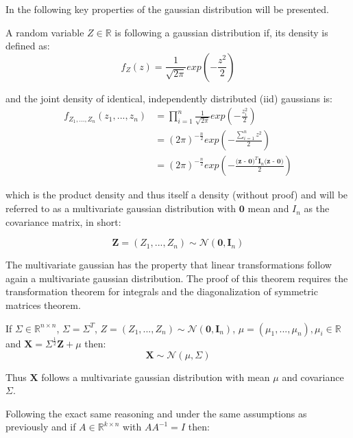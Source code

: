 \documentclass[
]{article}
\begin{document}
In the following key properties of the gaussian distribution will be
presented.

A random variable \(Z \in \mathbb{R}\) is following a gaussian
distribution if, its density is defined as: \[
\begin{equation*}
    f_Z(z) = \frac{1}{\sqrt{2\pi}} exp(-\frac{z^2}{2})
\end{equation*}
\]

and the joint density of identical, independently distributed (iid)
gaussians is: \[
\begin{equation*} 
    \begin{aligned}
        f_{Z_1,...,Z_n}(z_1,...,z_n) &= \prod_{i=1}^n \frac{1}{\sqrt{2\pi}} exp(-\frac{z_i^2}{2}) \\
                      &= (2\pi)^{-\frac{n}{2}}exp(-\frac{\sum_{i=1}^nz^2}{2}) \\
                      &= (2\pi)^{-\frac{n}{2}}exp(-\frac{\textbf{(z - 0)}^T \textbf{I}_n \textbf{(z - 0)}}{2}) 
    \end{aligned}
\end{equation*}
\]

which is the product density and thus itself a density (without proof)
and will be referred to as a multivariate gaussian distribution with
\(\textbf{0}\) mean and \(I_n\) as the covariance matrix, in short:

\[
\begin{equation*} 
        \textbf{Z} = (Z_1,...,Z_n) \sim \mathcal{N}(\textbf{0}, \textbf{I}_n)
\end{equation*}
\]

The multivariate gaussian has the property that linear transformations
follow again a multivariate gaussian distribution. The proof of this
theorem requires the transformation theorem for integrals and the
diagonalization of symmetric matrices theorem.

If \(\Sigma \in \mathbb{R}^{n\times n}\), \(\Sigma = \Sigma^T\),
\(Z = (Z_1,..., Z_n) \sim \mathcal{N}(\textbf{0}, \textbf{I}_n)\),
\(\mu = (\mu_1,..., \mu_n), \mu_i \in \mathbb{R}\) and
\(\textbf{X} = \Sigma^{\frac{1}{2}} \textbf{Z} + \mu\) then: \[
\begin{equation*}
    \textbf{X} \sim \mathcal{N}(\mu, \Sigma)
\end{equation*} 
\]

Thus \(\textbf{X}\) follows a multivariate gaussian distribution with
mean \(\mu\) and covariance \(\Sigma\).

Following the exact same reasoning and under the same assumptions as
previously and if \(A \in \mathbb{R}^{k \times n}\) with \(AA^{-1} = I\)
then:
\end{document}
